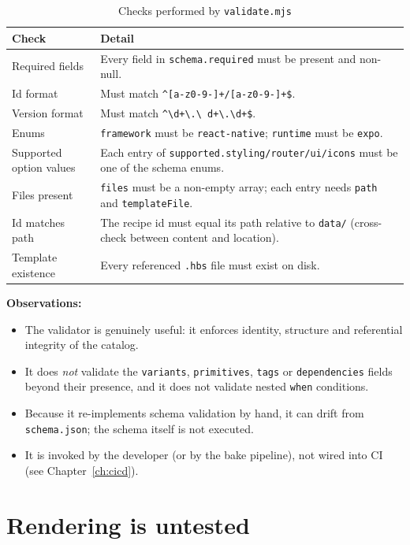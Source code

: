 \begin{longtable}{p{4.6cm}p{9.6cm}}
\caption{Checks performed by \texttt{validate.mjs}}\\
\toprule
\textbf{Check} & \textbf{Detail} \\
\midrule

Required fields & Every field in \texttt{schema.required} must be present and
non-null. \\
Id format & Must match \texttt{\^{}[a-z0-9-]+/[a-z0-9-]+\$}. \\
Version format & Must match \texttt{\^{}\textbackslash d+\textbackslash.\textbackslash
d+\textbackslash.\textbackslash d+\$}. \\
Enums & \texttt{framework} must be \texttt{react-native}; \texttt{runtime} must be
\texttt{expo}. \\
Supported option values & Each entry of \texttt{supported.styling/router/ui/icons}
must be one of the schema enums. \\
Files present & \texttt{files} must be a non-empty array; each entry needs
\texttt{path} and \texttt{templateFile}. \\
Id matches path & The recipe id must equal its path relative to
\texttt{data/} (cross-check between content and location). \\
Template existence & Every referenced \texttt{.hbs} file must exist on disk. \\
\bottomrule
\end{longtable}

\textbf{Observations:}
\begin{itemize}
  \item The validator is genuinely useful: it enforces identity, structure and
        referential integrity of the catalog.
  \item It does \emph{not} validate the \texttt{variants}, \texttt{primitives},
        \texttt{tags} or \texttt{dependencies} fields beyond their presence, and
        it does not validate nested \texttt{when} conditions.
  \item Because it re-implements schema validation by hand, it can drift from
        \texttt{schema.json}; the schema itself is not executed.
  \item It is invoked by the developer (or by the bake pipeline), not wired into
        CI (see Chapter~\ref{ch:cicd}).
\end{itemize}

\section{Rendering is untested}

